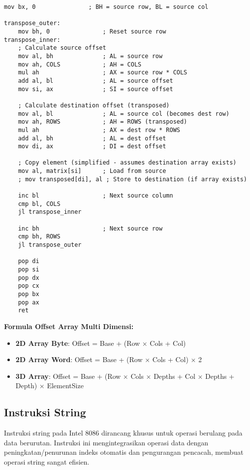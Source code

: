 \documentclass[../main.tex]{subfiles}
\begin{document}
\begin{lstlisting}[language={[x86masm]Assembler}, caption=Operasi Array Multi Dimensi, label={lst:multi-dim-array}]
    mov bx, 0               ; BH = source row, BL = source col
    
transpose_outer:
    mov bh, 0               ; Reset source row
transpose_inner:
    ; Calculate source offset
    mov al, bh              ; AL = source row
    mov ah, COLS            ; AH = COLS
    mul ah                  ; AX = source row * COLS
    add al, bl              ; AL = source offset
    mov si, ax              ; SI = source offset
    
    ; Calculate destination offset (transposed)
    mov al, bl              ; AL = source col (becomes dest row)
    mov ah, ROWS            ; AH = ROWS (transposed)
    mul ah                  ; AX = dest row * ROWS
    add al, bh              ; AL = dest offset
    mov di, ax              ; DI = dest offset
    
    ; Copy element (simplified - assumes destination array exists)
    mov al, matrix[si]      ; Load from source
    ; mov transposed[di], al ; Store to destination (if array exists)
    
    inc bl                  ; Next source column
    cmp bl, COLS
    jl transpose_inner
    
    inc bh                  ; Next source row
    cmp bh, ROWS
    jl transpose_outer
    
    pop di
    pop si
    pop dx
    pop cx
    pop bx
    pop ax
    ret
                \end{lstlisting}

                \textbf{Formula Offset Array Multi Dimensi:}
                \begin{itemize}
                    \item \textbf{2D Array Byte}: Offset = Base + (Row × Cols + Col)
                    \item \textbf{2D Array Word}: Offset = Base + (Row × Cols + Col) × 2
                    \item \textbf{3D Array}: Offset = Base + (Row × Cols × Depths + Col × Depths + Depth) × ElementSize
                \end{itemize}

        \subsection{Instruksi String}
            Instruksi string pada Intel 8086 dirancang khusus untuk operasi berulang pada data berurutan. Instruksi ini mengintegrasikan operasi data dengan peningkatan/penurunan indeks otomatis dan pengurangan pencacah, membuat operasi string sangat efisien.
\end{document}
